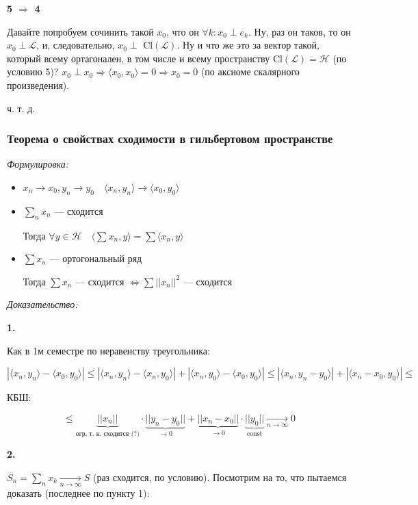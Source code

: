 \documentclass{article}
\def\goesto#1{\underset{#1}{\longrightarrow}}
\def\toinf#1{\goesto{#1 \rightarrow \infty}}
\def\ntoinf{\toinf{n}}
\def\sk#1#2{\langle #1, #2 \rangle}
\DeclareMathOperator{\const}{const}
\begin{document}
\textbf{5 $\Rightarrow$ 4}

Давайте попробуем сочинить такой $x_0$, что он $\forall k: x_0 \perp e_k$. Ну, раз он таков, то он $x_0 \perp \mathcal{L}$, и, следовательно, $x_0 \perp$ Cl$(\mathcal{L})$. Ну и что же это за вектор такой, который всему ортагонален, в том числе и всему пространству Cl$(\mathcal{L}) = \mathcal{H}$ (по условию 5)? $x_0 \perp x_0 \Rightarrow \sk{x_0}{x_0} = 0 \Rightarrow x_0 = 0$ (по аксиоме скалярного произведения).

ч. т. д. 

\newpage


\subsubsection{Теорема о свойствах сходимости в гильбертовом пространстве}
\textit{Формулировка:}

\begin{itemize}
    \item $x_n \rightarrow x_0, y_n \rightarrow y_0 \quad \langle x_n, y_n \rangle \rightarrow \langle x_0, y_0 \rangle$
    \item $\sum_n x_n$ --- сходится
    
    Тогда $\forall y \in \mathcal{H} \quad \langle \sum x_n , y\rangle = \sum \langle x_n, y \rangle$

    \item $\sum x_n$ --- ортогональный ряд
    
    Тогда $\sum x_n$ --- сходится $\Leftrightarrow \sum ||x_n||^2$ --- сходится
\end{itemize}

\textit{Доказательство:}

\textbf{1.}

Как в 1м семестре по неравенству треугольника:

\[|\sk{x_n}{y_n} -\sk{x_0}{y_0}| \le |\sk{x_n}{y_n} - \sk{x_n}{y_0}| + |\sk{x_n}{y_0} - \sk{x_0}{y_0}| \le |\sk{x_n}{y_n - y_0}| + |\sk{x_n - x_0}{y_0}| \le \]

КБШ:

\[ \le \underbrace{||x_n||}_{\text{огр, т. к. сходится (?)}} \cdot \underbrace{||y_n - y_0||}_{\rightarrow 0} + \underbrace{||x_n - x_0||}_{\rightarrow 0} \cdot \underbrace{||y_0||}_{\const} \ntoinf 0\]

\textbf{2.}

$S_n = \sum_n x_k \ntoinf S$ (раз сходится, по условию). Посмотрим на то, что пытаемся доказать (последнее по пункту 1):
\end{document}
